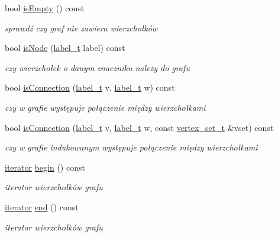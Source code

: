 \begin{DoxyCompactItemize}
bool \hyperlink{classGraph_ab3d0a9b8a15458f9fd6fe2ad71debaeb}{is\-Empty} () const 
\begin{DoxyCompactList}\small\item\em sprawdź czy graf nie zawiera wierzchołków \end{DoxyCompactList}\item 
bool \hyperlink{classGraph_aa52d8b66a416c850f24ea4a507f8bbc1}{is\-Node} (\hyperlink{classGraph_a2237a0ada8484c37b8200c0e3685ca71}{label\-\_\-t} label) const 
\begin{DoxyCompactList}\small\item\em czy wierzchołek o danym znaczniku należy do grafu \end{DoxyCompactList}\item 
bool \hyperlink{classGraph_af7c39ac36f29f27c0241796bd8f49973}{is\-Connection} (\hyperlink{classGraph_a2237a0ada8484c37b8200c0e3685ca71}{label\-\_\-t} v, \hyperlink{classGraph_a2237a0ada8484c37b8200c0e3685ca71}{label\-\_\-t} w) const 
\begin{DoxyCompactList}\small\item\em czy w grafie występuje połączenie między wierzchołkami \end{DoxyCompactList}\item 
bool \hyperlink{classGraph_afa6257363d71719e5cbb7a32485606fc}{is\-Connection} (\hyperlink{classGraph_a2237a0ada8484c37b8200c0e3685ca71}{label\-\_\-t} v, \hyperlink{classGraph_a2237a0ada8484c37b8200c0e3685ca71}{label\-\_\-t} w, const \hyperlink{classGraph_ac91822a10fe3fc10ea8449531fc32b95}{vertex\-\_\-set\-\_\-t} \&vset) const 
\begin{DoxyCompactList}\small\item\em czy w grafie indukowanym występuje połączenie między wierzchołkami \end{DoxyCompactList}\item 
\hyperlink{classGraph_a865985566962f6fcab1c0a465305424f}{iterator} \hyperlink{classGraph_a9db1e55265e70cd90f392355c7fb7e41}{begin} () const 
\begin{DoxyCompactList}\small\item\em iterator wierzchołków grafu \end{DoxyCompactList}\item 
\hyperlink{classGraph_a865985566962f6fcab1c0a465305424f}{iterator} \hyperlink{classGraph_adf6826e424173fd08bdf8574ef15ce33}{end} () const 
\begin{DoxyCompactList}\small\item\em iterator wierzchołków grafu \end{DoxyCompactList}\item 

\end{DoxyCompactItemize}
